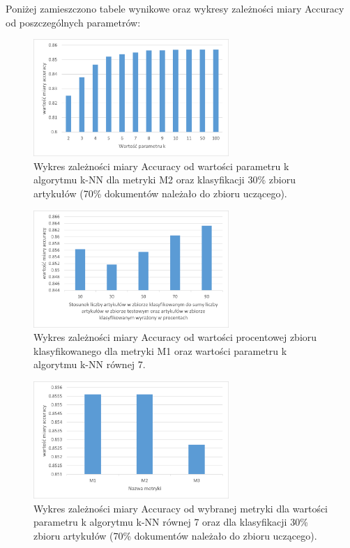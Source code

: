 \documentclass{classrep}
\begin{document}
Poniżej zamieszczono tabele wynikowe oraz wykresy zależności miary Accuracy od poszczególnych parametrów:

\begin{figure}[H]
\centering
\includegraphics[width=0.66\textwidth]{wykres5.png}
\caption{Wykres zależności miary Accuracy od wartości parametru k algorytmu k-NN dla metryki M2 oraz klasyfikacji 30\% zbioru artykułów (70\% dokumentów należało do zbioru uczącego).}
\end{figure}

\begin{figure}[H]
\centering
\includegraphics[width=0.66\textwidth]{wykres6.png}
\caption{Wykres zależności miary Accuracy od wartości procentowej zbioru klasyfikowanego dla metryki M1 oraz wartości parametru k algorytmu k-NN równej 7.}
\end{figure}

\begin{figure}[H]
\centering
\includegraphics[width=0.66\textwidth]{wykres7.png}
\caption{Wykres zależności miary Accuracy od wybranej metryki dla wartości parametru k algorytmu k-NN równej 7 oraz dla klasyfikacji 30\% zbioru artykułów (70\% dokumentów należało do zbioru uczącego).}
\end{figure}
\end{document}
